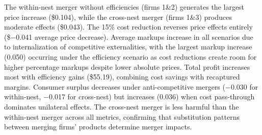 \documentclass[english,11pt]{article}
\begin{document}
The within-nest merger without efficiencies (firms 1\&2) generates the largest price increase (\$0.104), while the cross-nest merger (firms 1\&3) produces moderate effects (\$0.043). The 15\% cost reduction reverses price effects entirely (\$$-$0.041 average price decrease). Average markups increase in all scenarios due to internalization of competitive externalities, with the largest markup increase (0.050) occurring under the efficiency scenario as cost reductions create room for higher percentage markups despite lower absolute prices. Total profit increases most with efficiency gains (\$55.19), combining cost savings with recaptured margins. Consumer surplus decreases under anti-competitive mergers ($-$0.030 for within-nest, $-$0.017 for cross-nest) but increases (0.036) when cost pass-through dominates unilateral effects. The cross-nest merger is less harmful than the within-nest merger across all metrics, confirming that substitution patterns between merging firms' products determine merger impacts.



\end{document}
